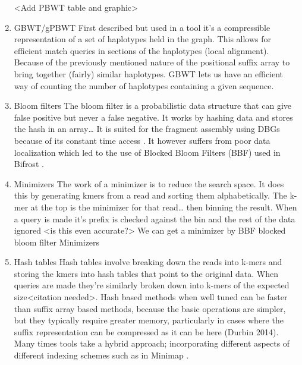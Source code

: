 \documentclass[a4paper]{article}
\begin{document}
\begin{enumerate}
<Add PBWT table and graphic>

\item GBWT/gPBWT
\label{sec:orged0db74}
First described \cite{novakGraphExtensionPositional2017} but used in a tool
\cite{sirenHaplotypeawareGraphIndexes2020} it’s a compressible representation of 
a set of haplotypes held in the graph. This allows for efficient match queries 
in sections of the haplotypes (local alignment). Because of the previously
mentioned nature of the positional suffix array to bring together (fairly) 
similar haplotypes.
GBWT lets us have an efficient way of counting the number of haplotypes 
containing a given sequence.

\item Bloom filters
\label{sec:org368c001}
The bloom filter is a probabilistic data structure that can give false positive
but never a false negative.  It works by hashing data and stores the hash in an
array\ldots{}
It is suited for the fragment assembly using DBGs because of its constant time
access \cite{chikhiSpaceefficientExactBruijn2013}. It however suffers from poor
data localization  which led to the use of Blocked Bloom Filters (BBF) 
\cite{putzeCacheHashSpaceefficient2010} used in
Bifrost \cite{holleyBifrostHighlyParallel2019}.

\item Minimizers
\label{sec:org030e65c}
The work of a minimizer is to reduce the search space. It does this by generating
kmers from a read and sorting them alphabetically. The k-mer at the top is the
minimizer for that read\ldots{} then binning the result. When a query is made it’s
prefix is checked against the bin and the rest of the data ignored
<is this even accurate?>
We can get a minimizer by BBF blocked bloom filter Minimizers
\cite{grabowskiDiskbasedCompressionData2015,robertsReducingStorageRequirements2004}

\item Hash tables
\label{sec:org5bed18a}
Hash tables involve breaking down the reads into k-mers and storing the kmers
into hash tables that point to the original data. When queries are made they’re 
similarly broken down into k-mers of the expected size<citation needed>.
Hash based methods when well tuned can be faster than suffix array based 
methods, because the basic operations are simpler, but they typically require
greater memory, particularly in cases where the suffix representation can be
compressed as it can be here (Durbin 2014).
Many times tools take a hybrid approach; incorporating different aspects of
different indexing schemes such as in Minimap
\cite{liDesignConstructionReference2020}. 
\end{enumerate}
\end{document}
